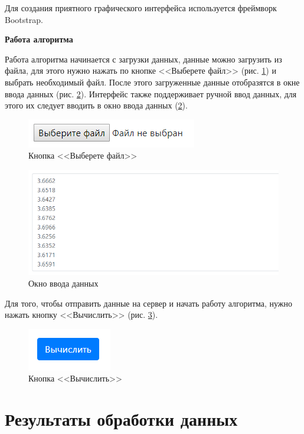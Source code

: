 \documentclass[a4paper,14pt]{article}
\begin{document}
	Для создания приятного графического интерфейса используется фреймворк Bootstrap.
	
\textbf{Работа алгоритма}
	
	Работа алгоритма начинается с загрузки данных, данные можно загрузить из файла, для этого нужно нажать по кнопке <<Выберете файл>> (рис. \ref{fig:screenshot001}) и выбрать необходимый файл.
	После этого загруженные данные отобразятся в окне ввода данных (рис. \ref{fig:screenshot002}).
	Интерфейс также поддерживает ручной ввод данных, для этого их следует вводить в окно ввода данных (\ref{fig:screenshot002}).
	
	\begin{figure}[H]
		\centering
		\includegraphics[width=0.4\linewidth]{images/screenshot001}
		\caption{Кнопка <<Выберете файл>>}
		\label{fig:screenshot001}
	\end{figure}
	
	
	\begin{figure}[H]
		\centering
		\includegraphics[width=0.7\linewidth]{images/screenshot002}
		\caption{Окно ввода данных}
		\label{fig:screenshot002}
	\end{figure}
	
	Для того, чтобы отправить  данные на сервер и начать работу алгоритма, нужно нажать кнопку <<Вычислить>> (рис. \ref{fig:screenshot003}).
	
	\begin{figure}[H]
		\centering
		\includegraphics[width=0.2\linewidth]{images/screenshot003}
		\caption{Кнопка <<Вычислить>>}
		\label{fig:screenshot003}
	\end{figure}

\section{Результаты обработки данных}
\end{document}
